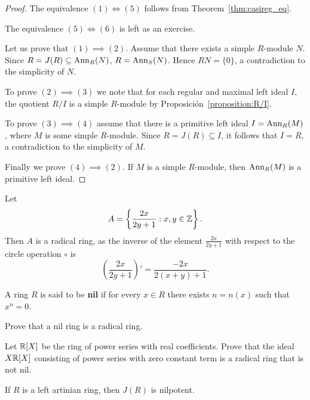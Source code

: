 \begin{proof}
	The equivalence $(1)\Longleftrightarrow(5)$ follows from 
	Theorem~\ref{thm:casireg_eq}. 
    
    The equivalence $(5)\Longleftrightarrow(6)$ is left as an exercise. 

	Let us prove that $(1)\implies(2)$. Assume that there exists a simple $R$-module $N$. Since 
	$R=J(R)\subseteq\operatorname{Ann}_R(N)$, $R=\operatorname{Ann}_S(N)$. 
	Hence $RN=\{0\}$, a contradiction to the simplicity of $N$.
	
	To prove $(2)\implies(3)$ we note that for each regular and maximal left ideal 
	$I$, the quotient $R/I$ is a simple $R$-module by
	Proposición~\ref{proposition:R/I}. 
	
	To prove $(3)\implies(4)$ assume that there is a primitive left ideal 
	$I=\operatorname{Ann}_R(M)$, where $M$ is some simple $R$-module. Since $R=J(R)\subseteq I$, it follows that  
    $I=R$, a contradiction to the simplicity of $M$.

	Finally we prove $(4)\implies(2)$. If $M$ is a simple $R$-module, then 
	$\operatorname{Ann}_R(M)$ is a primitive left ideal.
\end{proof}

\begin{example}
	Let 
	\[
	A=\left\{\frac{2x}{2y+1}:x,y\in\mathbb{Z}\right\}.
	\]
	Then $A$ is a radical ring, as the inverse of the element $\frac{2x}{2y+1}$
	with respect to the circle operation 
	$\circ$ is 
	\[
	\left(\frac{2x}{2y+1}\right)'=\frac{-2x}{2(x+y)+1}.
	\]
\end{example}

A ring $R$ is said to be \textbf{nil} if for every $x\in R$ there
exists $n=n(x)$ such that $x^n=0$. 

\begin{exercise}
    Prove that a nil ring is a radical ring. 
\end{exercise}

\begin{exercise}
    Let $\mathbb{R}[X]$ be the ring of power series with real coefficients. Prove that the ideal 
    $X\mathbb{R}[X]$ consisting of power series with zero constant term is a radical ring
    that is not nil. 
\end{exercise}

\begin{theorem}
	\label{thm:Jnilpotente}
	If $R$ is a left artinian ring, then $J(R)$ is nilpotent. 
\end{theorem}

